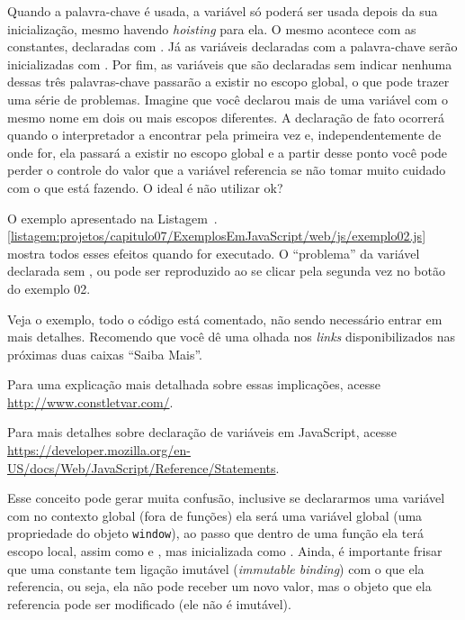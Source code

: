 Quando a palavra-chave  é usada, a variável só poderá ser usada depois da sua inicialização, mesmo havendo \textit{hoisting} para ela. O mesmo acontece com as constantes, declaradas com . Já as variáveis declaradas com a palavra-chave  serão inicializadas com . Por fim, as variáveis que são declaradas sem indicar nenhuma dessas três palavras-chave passarão a existir no escopo global, o que pode trazer uma série de problemas. Imagine que você declarou mais de uma variável com o mesmo nome em dois ou mais escopos diferentes. A declaração de fato ocorrerá quando o interpretador a encontrar pela primeira vez e, independentemente de onde for, ela passará a existir no escopo global e a partir desse ponto você pode perder o controle do valor que a variável referencia se não tomar muito cuidado com o que está fazendo. O ideal é não utilizar ok?

O exemplo apresentado na Listagem~\thechapter.\ref{listagem:projetos/capitulo07/ExemplosEmJavaScript/web/js/exemplo02.js} mostra todos esses efeitos quando for executado. O ``problema'' da variável declarada sem ,  ou  pode ser reproduzido ao se clicar pela segunda vez no botão do exemplo 02.


Veja o exemplo, todo o código está comentado, não sendo necessário entrar em mais detalhes. Recomendo que você dê uma olhada nos \textit{links} disponibilizados nas próximas duas caixas ``Saiba Mais''.

\begin{saibaMais}
    Para uma explicação mais detalhada sobre essas implicações, acesse \url{http://www.constletvar.com/}.
\end{saibaMais}

\begin{saibaMais}
    Para mais detalhes sobre declaração de variáveis em JavaScript, acesse \url{https://developer.mozilla.org/en-US/docs/Web/JavaScript/Reference/Statements}.
\end{saibaMais}

Esse conceito pode gerar muita confusão, inclusive se declararmos uma variável com  no contexto global (fora de funções) ela será uma variável global (uma propriedade do objeto \texttt{window}), ao passo que dentro de uma função ela terá escopo local, assim como  e , mas inicializada como . Ainda, é importante frisar que uma constante tem ligação imutável (\textit{immutable binding}) com o que ela referencia, ou seja, ela não pode receber um novo valor, mas o objeto que ela referencia pode ser modificado (ele não é imutável).



